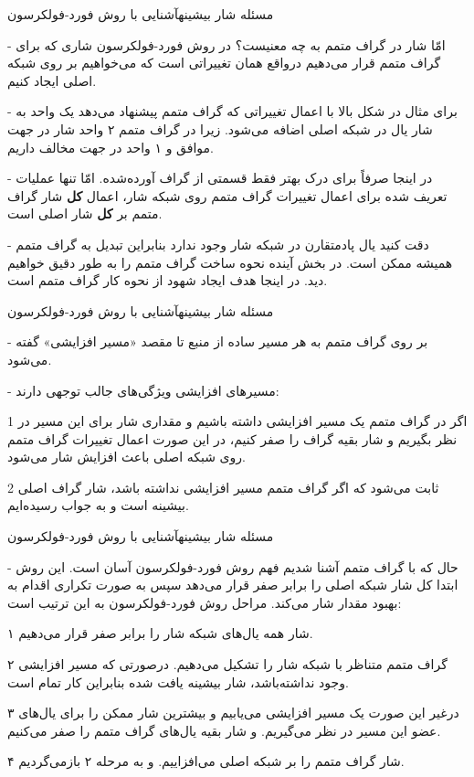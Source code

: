 \begin{itemframe}{مسئله شار بیشینه}{آشنایی با روش فورد-فولکرسون}
\item[-]
امّا شار در گراف متمم به چه معنیست؟ در روش فورد-فولکرسون شاری که برای گراف متمم قرار می‌دهیم درواقع همان تغییراتی است که می‌خواهیم بر روی شبکه اصلی ایجاد کنیم.
\item[-]
 برای مثال در شکل بالا با اعمال تغییراتی که گراف متمم پیشنهاد می‌دهد یک واحد به شار یال
 در شبکه اصلی اضافه می‌شود. زیرا در گراف متمم ۲ واحد شار در جهت موافق و ۱ واحد در جهت مخالف داریم.
\item[-]
در اینجا صرفاً برای درک بهتر فقط قسمتی از گراف آورده‌شده. امّا تنها عملیات تعریف شده برای اعمال تغییرات گراف متمم روی شبکه شار، اعمال \textbf{کل} شار گراف متمم بر \textbf{کل} شار اصلی است.
\item[-]
دقت کنید یال پادمتقارن در شبکه شار وجود ندارد بنابراین تبدیل به گراف متمم همیشه ممکن است. در بخش آینده نحوه ساخت گراف متمم را به طور دقیق خواهیم دید. در اینجا هدف ایجاد شهود از نحوه کار گراف متمم است.
\end{itemframe}

\begin{itemframe}{مسئله شار بیشینه}{آشنایی با روش فورد-فولکرسون}
\item[-]
بر روی گراف متمم به هر مسیر ساده از منبع تا مقصد «مسیر افزایشی»
گفته می‌شود.
\item[-]
مسیر‌های افزایشی ویژگی‌های جالب توجهی دارند:
\item[1]
اگر در گراف متمم یک مسیر افزایشی داشته باشیم و مقداری شار برای این مسیر در نظر بگیریم و شار بقیه گراف را صفر کنیم، در این صورت اعمال تغییرات گراف متمم روی شبکه اصلی باعث افزایش شار می‌شود.
\item[2]
ثابت می‌شود که اگر گراف متمم مسیر افزایشی نداشته باشد، شار گراف اصلی بیشینه است و به جواب رسیده‌ایم.
\end{itemframe}


\begin{itemframe}{مسئله شار بیشینه}{آشنایی با روش فورد-فولکرسون}
\item[-]
حال که با گراف متمم آشنا شدیم فهم روش فورد-فولکرسون آسان است. این روش ابتدا کل شار شبکه اصلی را برابر صفر قرار می‌دهد سپس به صورت تکراری اقدام به بهبود مقدار شار می‌کند. مراحل روش فورد-فولکرسون به این ترتیب است:
\item[۱]
شار همه یال‌های شبکه شار را برابر صفر قرار می‌دهیم.
\item[۲]
گراف متمم متناظر با شبکه شار را تشکیل می‌دهیم. درصورتی که مسیر افزایشی وجود نداشته‌باشد، شار بیشینه یافت شده بنابراین کار تمام است.
\item[۳]
درغیر این صورت یک مسیر افزایشی می‌یابیم و بیشترین شار ممکن را برای یال‌های عضو این مسیر در نظر می‌گیریم. و شار بقیه یال‌های گراف متمم را صفر می‌کنیم.
\item[۴]
شار گراف متمم را بر شبکه اصلی می‌افزاییم. و به مرحله ۲ بازمی‌گردیم.

\end{itemframe}

